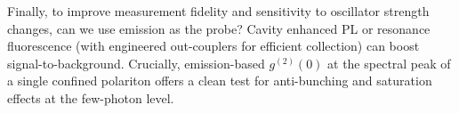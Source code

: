 Finally, to improve measurement fidelity and sensitivity to oscillator strength changes, can we use emission as the probe?
Cavity enhanced PL or resonance fluorescence (with engineered out-couplers for efficient collection) can boost signal-to-background.
Crucially, emission-based $g^{(2)}(0)$ at the spectral peak of a single confined polariton offers a clean test for anti-bunching and saturation effects at the few-photon level.


